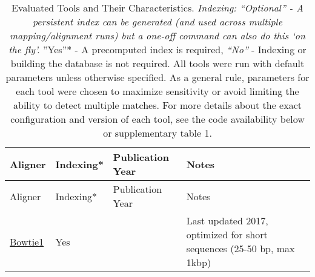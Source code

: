 \documentclass[
]{article}
\begin{document}
\begin{longtable}[]{@{}
  >{\raggedright\arraybackslash}p{}
  >{\centering\arraybackslash}p{}
  >{\centering\arraybackslash}p{}
  >{\raggedright\arraybackslash}p{}@{}}
\caption{Evaluated Tools and Their Characteristics. \emph{Indexing:
``\emph{Optional}'' - A persistent index can be generated (and used
across multiple mapping/alignment runs) but a one-off command can also
do this `on the fly'. }''Yes''* - A precomputed index is required,
\emph{``No''} - Indexing or building the database is not required. All
tools were run with default parameters unless otherwise specified. As a
general rule, parameters for each tool were chosen to maximize
sensitivity or avoid limiting the ability to detect multiple matches.
For more details about the exact configuration and version of each tool,
see the code availability below or supplementary table
1.}\label{tbl-tools}\tabularnewline
\toprule\noalign{}
\begin{minipage}[b]{\linewidth}\raggedright
Aligner
\end{minipage} & \begin{minipage}[b]{\linewidth}\centering
Indexing*
\end{minipage} & \begin{minipage}[b]{\linewidth}\centering
Publication Year
\end{minipage} & \begin{minipage}[b]{\linewidth}\raggedright
Notes
\end{minipage} \\
\midrule\noalign{}
\endfirsthead
\toprule\noalign{}
\begin{minipage}[b]{\linewidth}\raggedright
Aligner
\end{minipage} & \begin{minipage}[b]{\linewidth}\centering
Indexing*
\end{minipage} & \begin{minipage}[b]{\linewidth}\centering
Publication Year
\end{minipage} & \begin{minipage}[b]{\linewidth}\raggedright
Notes
\end{minipage} \\
\midrule\noalign{}
\endhead
\bottomrule\noalign{}
\endlastfoot
\href{https://github.com/BenLangmead/bowtie}{Bowtie1} & Yes & 2009 &
Last updated 2017, optimized for short sequences (25-50 bp, max 1kbp) \\

\end{longtable}
\end{document}
